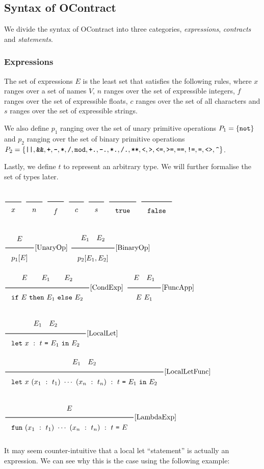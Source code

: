\documentclass[a4paper]{article}
\newcommand{\Rule}[2]{\genfrac{}{}{0.7pt}{}{{\setlength{\fboxrule}{0pt}\setlength{\fboxsep}{3mm}\fbox{$#1$}}}{{\setlength{\fboxrule}{0pt}\setlength{\fboxsep}{3mm}\fbox{$#2$}}}}
\newcommand{\RuleWithName}[3]{\genfrac{}{}{0.7pt}{}{{\setlength{\fboxrule}{0pt}\setlength{\fboxsep}{3mm}\fbox{$#1$}}}{{\setlength{\fboxrule}{0pt}\setlength{\fboxsep}{3mm}\fbox{$#2$}}}[\text{#3}]}
\newcommand{\TruE}{\texttt{true}}
\newcommand{\FalsE}{\texttt{false}}
\begin{document}
\subsection{Syntax of OContract}

We divide the syntax of OContract into three categories, \textit{expressions}, \textit{contracts} and \textit{statements}.

\subsubsection*{Expressions}

The set of expressions $E$ is the least set that satisfies the following rules, where $x$ ranges over a set of names $V$,
$n$ ranges over the set of expressible integers, $f$ ranges over the set of expressible floats, $c$ ranges over the
set of all characters and $s$ ranges over the set of expressible strings.

We also define $p_1$ ranging over the set of unary primitive operations $P_1=\{\verb|not|\}$
and $p_2$ ranging over the set of binary primitive operations $P_2=\{\verb@||@,\verb#&&#, \verb#+#, \verb#-#,\verb#*#,\verb#/#, \verb#mod#,
\verb#+.#, \verb#-.#,\verb#*.#,\verb#/.#, \verb#**#,\verb#<#, \verb#>#, \verb#<=#, \verb#>=#, \verb#==#, \verb#!=#, \verb#=#, \verb#<>#, \verb#^#\}$.

Lastly, we define $t$ to represent an arbitrary type.
We will further formalise the set of types later.

$\Rule{}{x}$
\hfill
$\Rule{}{n}$
\hfill
$\Rule{}{f}$
\hfill
$\Rule{}{c}$
\hfill
$\Rule{}{s}$
\hfill
$\Rule{}{\TruE}$
\hfill
$\Rule{}{\FalsE}$

$\RuleWithName{E}{p_1[E]}{UnaryOp}$
\hfill
$\RuleWithName{E_1\quad E_2}{p_2[E_1, E_2]}{BinaryOp}$
\hfill
$\RuleWithName{E\qquad E_1\qquad E_2}{\texttt{if}\ E\ \texttt{then}\ E_1\ \texttt{else}\ E_2}{CondExp}$
\hfill
$\RuleWithName{E\quad E_1}{E\ E_1}{FuncApp}$

$\RuleWithName{E_1\quad E_2}{\texttt{let}\ x\ :\ t\ \texttt{=}\ E_1\ \texttt{in}\ E_2}{LocalLet}$
\hfill
$\RuleWithName{E_1\quad E_2}{\texttt{let}\ x\ (x_1\ :\ t_1)\ \cdots\ (x_n\ :\ t_n)\ :\ t\ \texttt{=}\ E_1\ \texttt{in}\ E_2}{LocalLetFunc}$

$\RuleWithName{E}{\texttt{fun}\ (x_1\ :\ t_1)\ \cdots\ (x_n\ :\ t_n)\ :\ t\ \texttt{=}\ E}{LambdaExp}$

It may seem counter-intuitive that a local let ``statement'' is actually an expression.
We can see why this is the case using the following example:
\end{document}
